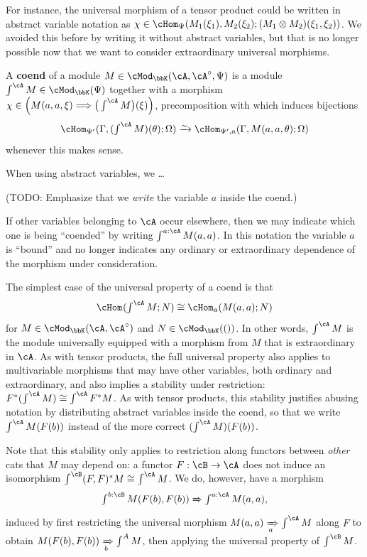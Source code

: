 \documentclass{amsart}
\newcommand{\A}{\cA}
\newcommand{\B}{\cB}
\newcommand{\K}{\bbK}
\let\mod\cMod
\def\modk{\mod_\K}
\renewcommand{\o}{^{\circ}}
\let\vdash\Longrightarrow
\let\mto\vdash    %
\def\mtoo#1{\xRightarrow[#1]{}}
\def\mhom#1#2{\left( #1 \vphantom{\big|}\mto #2 \right)}
\def\mhomv#1#2#3{\cHom_{#1}(#2;#3)}
\newcommand{\coend}{\begingroup\textstyle\int\endgroup}
\begin{document}
For instance, the universal morphism of a tensor product could be written in abstract variable notation as $\chi \in \mhomv{\Psi}{M_1(\xi_1), M_2(\xi_2)}{(M_1\otimes M_2)(\xi_1,\xi_2)}$.
We avoided this before by writing it without abstract variables, but that is no longer possible now that we want to consider extraordinary universal morphisms.

\begin{defn}
  A \textbf{coend} of a module $M\in \modk(\A,\A\o,\Psi)$ is a module $\coend^\A M\in\modk(\Psi)$ together with a morphism $\chi\in\mhom{M(a,a,\xi)}{\big(\coend^\A M\big)(\xi)}$, precomposition with which induces bijections
  \[ \mhomv{\Psi'}{\Gamma,(\coend^\A M)(\theta)}{\Omega} \toiso \mhomv{\Psi',a}{\Gamma,M(a,a,\theta)}{\Omega} \]
  whenever this makes sense.
\end{defn}

When using abstract variables, we \dots

(TODO: Emphasize that we \emph{write} the variable $a$ inside the coend.)

If other variables belonging to $\A$ occur elsewhere, then we may indicate which one is being ``coended'' by writing $\coend^{a:\A} M(a,a)$.
In this notation the variable $a$ is ``bound'' and no longer indicates any ordinary or extraordinary dependence of the morphism under consideration.

The simplest case of the universal property of a coend is that
\[ \mhomv{}{\coend^\A M}{N} \cong \mhomv{a}{M(a,a)}{N} \]
for $M\in\modk(\A,\A\o)$ and $N\in\modk(())$.
In other words, $\coend^\A M$ is the module universally equipped with a morphism from $M$ that is extraordinary in $\A$.
As with tensor products, the full universal property also applies to multivariable morphisms that may have other variables, both ordinary and extraordinary, and also implies a stability under restriction: $F^*(\coend^\A M) \cong \coend^\A F^*M$.
As with tensor products, this stability justifies abusing notation by distributing abstract variables inside the coend, so that we write $\coend^\A M(F(b))$ instead of the more correct $(\coend^\A M)(F(b))$.

Note that this stability only applies to restriction along functors between \emph{other} cats that $M$ may depend on: a functor $F:\B\to \A$ does not induce an isomorphism $\coend^{\B} (F,F)^* M \cong \coend^\A M$.
We do, however, have a morphism
\[\coend^{b:\B} M(F(b),F(b)) \mtoo{} \coend^{a:\A} M(a,a),\]
induced by first restricting the universal morphism $M(a,a) \mtoo{a} \coend^\A M$ along $F$ to obtain $M(F(b),F(b)) \mtoo{b} \coend^A M$, then applying the universal property of $\coend^\B M$.
\end{document}
